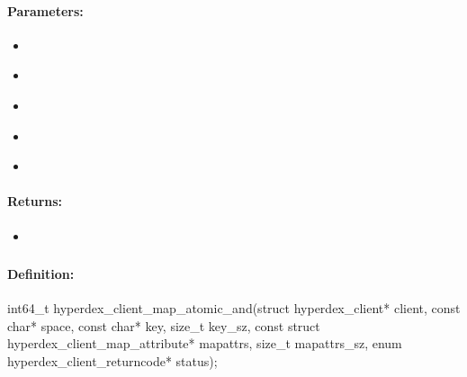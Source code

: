 \paragraph{Parameters:}
\begin{itemize}[noitemsep]
\item {}\\

\item {}\\

\item {}\\

\item {}\\

\item {}\\

\end{itemize}

\paragraph{Returns:}
\begin{itemize}[noitemsep]
\item {}\\

\end{itemize}

\pagebreak
\subsubsection{}
\label{api:c:map_atomic_and}


\paragraph{Definition:}
\begin{ccode}
int64_t hyperdex_client_map_atomic_and(struct hyperdex_client* client,
        const char* space,
        const char* key, size_t key_sz,
        const struct hyperdex_client_map_attribute* mapattrs, size_t mapattrs_sz,
        enum hyperdex_client_returncode* status);
\end{ccode}

